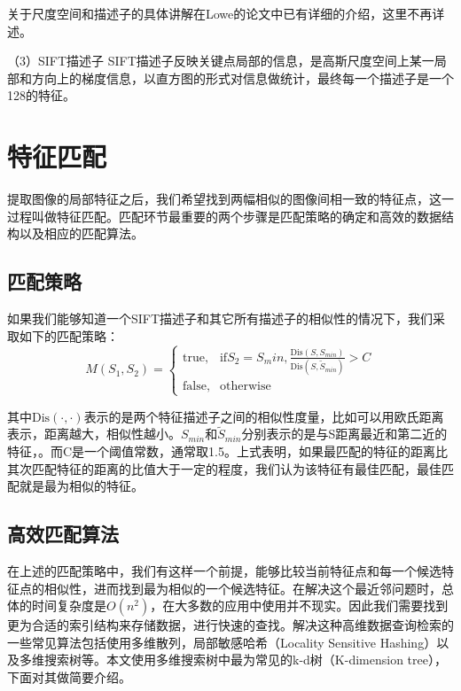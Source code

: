 关于尺度空间和描述子的具体讲解在Lowe的论文中\cite{Lowe:2004uq}已有详细的介绍，这里不再详述。

（3）SIFT描述子
SIFT描述子反映关键点局部的信息，是高斯尺度空间上某一局部和方向上的梯度信息，以直方图的形式对信息做统计，最终每一个描述子是一个128的特征。

\section{特征匹配}
提取图像的局部特征之后，我们希望找到两幅相似的图像间相一致的特征点，这一过程叫做特征匹配。匹配环节最重要的两个步骤是匹配策略的确定和高效的数据结构以及相应的匹配算法。

\subsection{匹配策略}
如果我们能够知道一个SIFT描述子和其它所有描述子的相似性的情况下，我们采取如下的匹配策略：
\begin{equation}
  M(S_1,S_2) = 
\begin{cases} 
\text{true}, & \mbox{if} S_2 = S_min,\frac{\text{Dis}(S,S_{min})}{\text{Dis}(S,\tilde{S}_{min})} > C \\
\text{false}, & \mbox{otherwise}
\end{cases}
\end{equation}

其中\(\text{Dis}(\cdot,\cdot)\)表示的是两个特征描述子之间的相似性度量，比如可以用欧氏距离表示，距离越大，相似性越小。\(S_{min}\)和\(\tilde{S}_{min}\)分别表示的是与S距离最近和第二近的特征，。而C是一个阈值常数，通常取1.5。上式表明，如果最匹配的特征的距离比其次匹配特征的距离的比值大于一定的程度，我们认为该特征有最佳匹配，最佳匹配就是最为相似的特征。

\subsection{高效匹配算法}
在上述的匹配策略中，我们有这样一个前提，能够比较当前特征点和每一个候选特征点的相似性，进而找到最为相似的一个候选特征。在解决这个最近邻问题时，总体的时间复杂度是\(O(n^2)\)，在大多数的应用中使用并不现实。因此我们需要找到更为合适的索引结构来存储数据，进行快速的查找。解决这种高维数据查询检索的一些常见算法包括使用多维散列，局部敏感哈希（Locality Sensitive Hashing）以及多维搜索树等。本文使用多维搜索树中最为常见的k-d树（K-dimension tree），下面对其做简要介绍。

